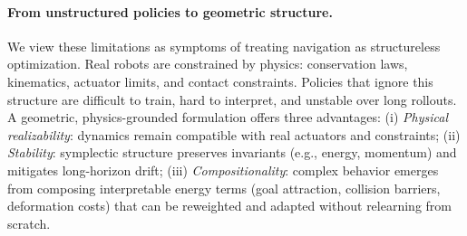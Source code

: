 \documentclass{article} %
\begin{document}
\paragraph{From unstructured policies to geometric structure.}
We view these limitations as symptoms of treating navigation as structureless optimization. Real robots are constrained by physics: conservation laws, kinematics, actuator limits, and contact constraints. Policies that ignore this structure are difficult to train, hard to interpret, and unstable over long rollouts. A geometric, physics-grounded formulation offers three advantages:
(i) \emph{Physical realizability}: dynamics remain compatible with real actuators and constraints;
(ii) \emph{Stability}: symplectic structure preserves invariants (e.g., energy, momentum) and mitigates long-horizon drift;
(iii) \emph{Compositionality}: complex behavior emerges from composing interpretable energy terms (goal attraction, collision barriers, deformation costs) that can be reweighted and adapted without relearning from scratch.
\end{document}
